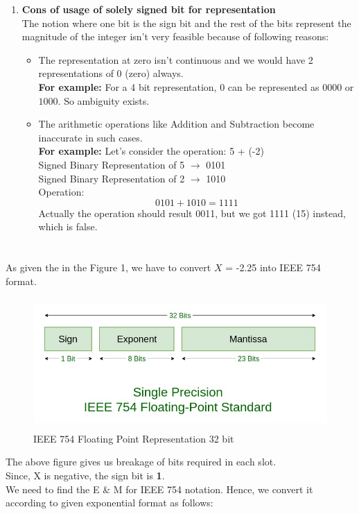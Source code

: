 \documentclass[12pt]{article}
\begin{document}
\begin{enumerate}[label=(\alph*)]
    \item \textbf{Cons of usage of solely signed bit for representation}\\
    The notion where one bit is the sign bit and the rest of the bits represent the magnitude of the integer isn't very feasible because of following reasons:
    \begin{itemize}
        \item The representation at zero isn't continuous and we would have 2 representations of $0$ (zero) always. \\
    \textbf{For example:} For a 4 bit representation, $0$ can be represented as $0000$ or $1000$. So ambiguity exists.
    \item The arithmetic operations like Addition and Subtraction become inaccurate in such cases. \\
    \textbf{For example:} Let's consider the operation: 5 + (-2) \\
    Signed Binary Representation of 5 $\rightarrow$ 0101 \\
    Signed Binary Representation of 2 $\rightarrow$ 1010 \\
    Operation: \\
    \begin{equation*}
        0101 + 1010 = 1111
    \end{equation*}
    Actually the operation should result 0011, but we got 1111 (15) instead, which is false.
    \end{itemize}
\end{enumerate}

\section{}
As given the in the Figure 1, we have to convert $X$ = -2.25 into IEEE 754 format.
    \begin{figure}
    \centering
    \includegraphics[width=15cm, height=5cm]{Single-Precision-IEEE-754-Floating-Point-Standard.png}
    \caption{IEEE 754 Floating Point Representation 32 bit}
\end{figure}
    The above figure gives us breakage of bits required in each slot.\\
    Since, X is negative, the sign bit is \textbf{1}.\\
    We need to find the E \& M for IEEE 754 notation. Hence, we convert it according to given exponential format as follows:\\
    
\end{document}
